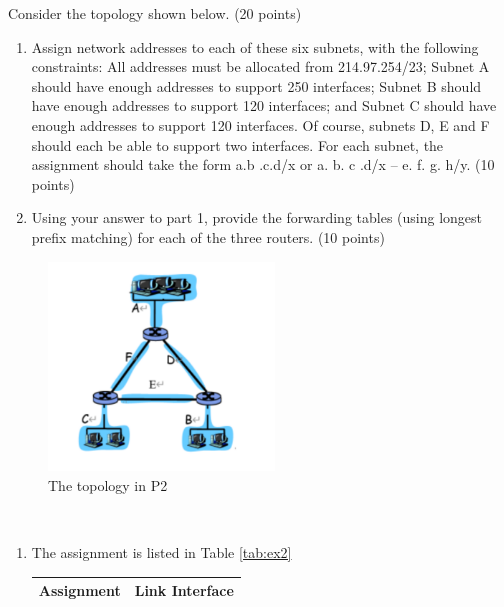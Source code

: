 \begin{exercise}[]{Consider the topology shown below. (20 points)
  \begin{enumerate}
    \item Assign network addresses to each of these six subnets, with the following constraints:
    All addresses must be allocated from 214.97.254/23; Subnet A should have enough  addresses to support 250 interfaces; Subnet B should have enough addresses to support
    120 interfaces; and Subnet C should have enough addresses to support 120 interfaces.
    Of course, subnets D, E and F should each be able to support two interfaces. For each
    subnet, the assignment should take the form a.b .c.d/x or a. b. c .d/x – e. f. g. h/y.
    (10 points)
    \item Using your answer to part 1, provide the forwarding tables (using longest prefix matching) for each of the three routers. (10 points)
  \end{enumerate}}
  \begin{figure}[hb]
    \begin{center}
    \includegraphics[width=6cm]{img/ass4/ex2}
    \caption{The topology in P2}
    \label{fig:ex2}
    \end{center}
  \end{figure}
  \begin{solution}
  \par{~}
  \begin{enumerate}
    \item The assignment is listed in Table \ref{tab:ex2}
    \begin{table}[h]
      \centering
      \begin{tabular}{lc}
      \hline
      \multicolumn{1}{c}{\textbf{Assignment}} & \textbf{Link Interface} \\ \hline

\end{tabular}
\end{table}
\end{enumerate}
\end{solution}
\end{exercise}
